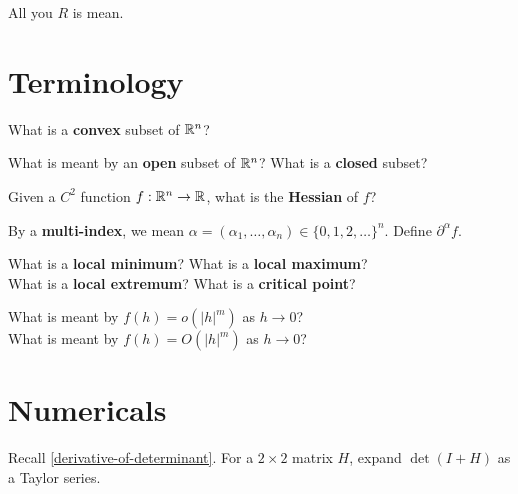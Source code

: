 \documentclass{homework}
\author{Jim Fowler}
\begin{document}
\maketitle

\begin{inspiration}
All you $R$ is mean.
\end{inspiration}

\section{Terminology}

\begin{problem}
  What is a \textbf{convex} subset of $\mathbb{R}^n$?
\end{problem}

\begin{problem}
  What is meant by an \textbf{open} subset of $\mathbb{R}^n$? What is a \textbf{closed} subset?
\end{problem}

\begin{problem}
  Given a $C^2$ function $f:\mathbb{R}^n\to\mathbb{R}$, what is the \textbf{Hessian} of $f$?
\end{problem}

\begin{problem}\label{multiindex}%
  By a \textbf{multi-index}, we mean $\alpha=(\alpha_1,\dots,\alpha_n)\in \{0,1,2,\dots\}^n$.
  Define $\partial^\alpha f$.
\end{problem}

\begin{problem}
  What is a \textbf{local minimum}? What is a \textbf{local maximum}? \\
  What is a \textbf{local extremum}? What is a \textbf{critical point}?
\end{problem}

\begin{problem}
  What is meant by $f(h)=o(|h|^m)$ as $h\to 0$? \\
  What is meant by $f(h)=O(|h|^m)$ as $h\to 0$?
\end{problem}

\section{Numericals}

\begin{problem}\label{taylor-of-determinant}%
  Recall \ref{derivative-of-determinant}. For a $2\times 2$ matrix $H$, expand $\det(I+H)$ as a Taylor series.
\end{problem}
\end{document}
